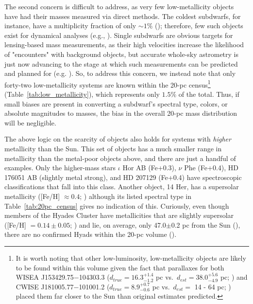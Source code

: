 \documentclass[twocolumn,tighten,twocolappendix]{aastex631}
\begin{document}
The second concern is difficult to address, as very few low-metallicity objects have had their masses measured via direct methods. The coldest subdwarfs, for instance, have a multiplicity fraction of only ${\sim}1\%$ (\citealt{gonzalez-payo2021}); therefore, few such objects exist for dynamical analyses (e.g., \citealt{rebassa-mansergas2019}). Single subdwarfs are obvious targets for lensing-based mass measurements, as their high velocities increase the likelihood of "encounters" with background objects, but accurate whole-sky astrometry is just now advancing to the stage at which such measurements can be predicted and planned for (e.g. \citealt{sahu2020}). So, to address this concern, we instead note that only forty-two low-metallicity systems are known within the 20-pc census\footnote{It is worth noting that other low-luminosity, low-metallicity objects are likely to be found within this volume given the fact that parallaxes for both WISEA J153429.75$-$104303.3 ($d_{true} = 16.3^{+1.4}_{-1.2}$ pc vs.\ $d_{est} = 38.0^{+5.6}_{-4.9}$ pc; \citealt{kirkpatrick2021b,meisner2020a}) and CWISE J181005.77$-$101001.2 ($d_{true} = 8.9^{+0.7}_{-0.6}$ pc vs.\ $d_{est} = $ 14 - 64 pc; \citealt{lodieu2022,schneider2020}) placed them far closer to the Sun than original estimates predicted.} (Table~\ref{tab:low_metallicity}), which represents only $1.5\%$ of the total. Thus, if small biases are present in converting a subdwarf's spectral type, colors, or absolute magnitudes to masses, the bias in the overall 20-pc mass distribution will be negligible. 

The above logic on the scarcity of objects also holds for systems with {\it higher} metallicity than the Sun. This set of objects has a much smaller range in metallicity than the metal-poor objects above, and there are just a handful of examples. Only the higher-mass stars $\iota$ Hor AB (Fe+0.3), $\nu$ Phe (Fe+0.4), HD 176051 AB (slightly metal strong), and HD 207129 (Fe+0.4) have spectroscopic classifications that fall into this class. Another object, 14 Her, has a supersolar metallicity ([Fe/H] $\approx 0.4$; \citealt{rosenthal2021}) although its listed spectral type in Table~\ref{tab:20pc_census} gives no indication of this. Curiously, even though members of the Hyades Cluster have metallicities that are slightly supersolar ([Fe/H] $= 0.14{\pm}0.05$; \citealt{perryman1998}) and lie, on average, only 47.0$\pm$0.2 pc from the Sun (\citealt{lodieu2019}), there are no confirmed Hyads within the 20-pc volume (\citealt{smart2020,schneider2022}).
\end{document}
